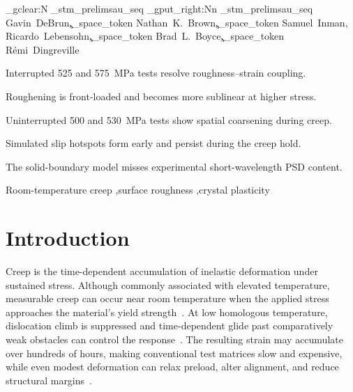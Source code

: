 \documentclass[final,12pt]{cas-sc}
\begin{document}
\ExplSyntaxOn
\seq_gclear:N \g_stm_prelimsau_seq
\seq_gput_right:Nn \g_stm_prelimsau_seq
  {Gavin~DeBrun,\c_space_token Nathan~K.~Brown,\c_space_token Samuel~Inman,\\
   Ricardo~Lebensohn,\c_space_token Brad~L.~Boyce,\c_space_token R\'emi~Dingreville}
\ExplSyntaxOff
\begin{highlights}
\item Interrupted 525 and 575~MPa tests resolve roughness--strain coupling.
\item Roughening is front-loaded and becomes more sublinear at higher stress.
\item Uninterrupted 500 and 530~MPa tests show spatial coarsening during creep.
\item Simulated slip hotspots form early and persist during the creep hold.
\item The solid-boundary model misses experimental short-wavelength PSD content.
\end{highlights}

\begin{keywords}
Room-temperature creep \sep surface roughness \sep crystal plasticity
\end{keywords}


\maketitle

\section{Introduction}

Creep is the time-dependent accumulation of inelastic deformation under sustained stress. Although commonly associated with elevated temperature, measurable creep can occur near room temperature when the applied stress approaches the material's yield strength~\cite{krempl1979experimental,kassner2014low,inman2025stochastic}. At low homologous temperature, dislocation climb is suppressed and time-dependent glide past comparatively weak obstacles can control the response~\cite{Landon1959,kassner2014low}. The resulting strain may accumulate over hundreds of hours, making conventional test matrices slow and expensive, while even modest deformation can relax preload, alter alignment, and reduce structural margins~\cite{XIE2020112332,TALEB20111936}.
\end{document}
